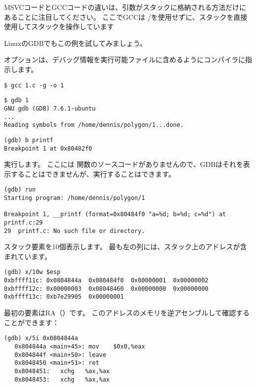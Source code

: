 

MSVCコードとGCCコードの違いは、引数がスタックに格納される方法だけにあることに注目してください。 
ここでGCCは \PUSH/\POP を使用せずに、スタックを直接使用してスタックを操作しています


Linuxの\ac{GDB}でもこの例を試してみましょう。

オプションは、デバッグ情報を実行可能ファイルに含めるようにコンパイラに指示します。

\begin{lstlisting}
$ gcc 1.c -g -o 1
\end{lstlisting}

\begin{lstlisting}
$ gdb 1
GNU gdb (GDB) 7.6.1-ubuntu
...
Reading symbols from /home/dennis/polygon/1...done.
\end{lstlisting}

\begin{lstlisting}[caption= \printf にブレークポイントを設定しましょう]
(gdb) b printf
Breakpoint 1 at 0x80482f0
\end{lstlisting}

実行します。
ここには \printf 関数のソースコードがありませんので、\ac{GDB}はそれを表示することはできませんが、実行することはできます。

\begin{lstlisting}
(gdb) run
Starting program: /home/dennis/polygon/1 

Breakpoint 1, __printf (format=0x80484f0 "a=%d; b=%d; c=%d") at printf.c:29
29	printf.c: No such file or directory.
\end{lstlisting}

スタック要素を10個表示します。 最も左の列には、スタック上のアドレスが含まれています。

\begin{lstlisting}
(gdb) x/10w $esp
0xbffff11c:	0x0804844a	0x080484f0	0x00000001	0x00000002
0xbffff12c:	0x00000003	0x08048460	0x00000000	0x00000000
0xbffff13c:	0xb7e29905	0x00000001
\end{lstlisting}

最初の要素は\ac{RA}（）です。 
このアドレスのメモリを逆アセンブルして確認することができます：

\begin{lstlisting}[label=NOP_as_XCHG_example,style=customasmx86]
(gdb) x/5i 0x0804844a
   0x804844a <main+45>:	mov    $0x0,%eax
   0x804844f <main+50>:	leave  
   0x8048450 <main+51>:	ret    
   0x8048451:	xchg   %ax,%ax
   0x8048453:	xchg   %ax,%ax
\end{lstlisting}


